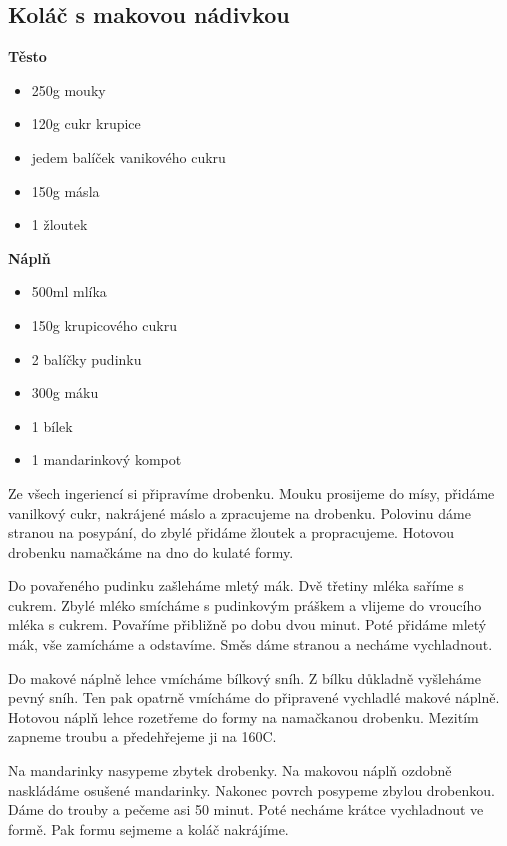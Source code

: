 \documentclass[10pt,a4paper]{article}
\newenvironment{myitemize}
{ \begin{itemize}
    \setlength{\itemsep}{0pt}
    \setlength{\parskip}{0pt}
    \setlength{\parsep}{0pt}     }
{ \end{itemize}                  }
\begin{document}
\subsection{Koláč s makovou nádivkou} 
\begin{minipage}[t]{0,5\textwidth}
\textbf{Těsto}
\begin{myitemize} 
\item 250g mouky
\item 120g cukr krupice
\item jedem balíček vanikového cukru
\item 150g másla
\item 1 žloutek
\end{myitemize}

\textbf{Náplň}
\begin{myitemize} 
\item 500ml mlíka
\item 150g krupicového cukru
\item 2 balíčky pudinku
\item 300g máku
\item 1 bílek
\item 1 mandarinkový kompot
\end{myitemize}
\end{minipage}
\begin{minipage}[t]{0,5\textwidth}
Ze všech ingeriencí si připravíme drobenku. Mouku prosijeme do mísy, přidáme vanilkový cukr, nakrájené máslo a zpracujeme na drobenku. Polovinu dáme stranou na posypání, do zbylé přidáme žloutek a propracujeme. Hotovou drobenku namačkáme na dno do kulaté formy.

Do povařeného pudinku zašleháme mletý mák. Dvě třetiny mléka saříme s cukrem. Zbylé mléko smícháme s pudinkovým práškem a vlijeme do vroucího mléka s cukrem. Povaříme přibližně po dobu dvou minut. Poté přidáme mletý mák, vše zamícháme a odstavíme. Směs dáme stranou a necháme vychladnout.

Do makové náplně lehce vmícháme bílkový sníh. Z bílku důkladně vyšleháme pevný sníh. Ten pak opatrně vmícháme do připravené vychladlé makové náplně. Hotovou náplň lehce rozetřeme do formy na namačkanou drobenku. Mezitím zapneme troubu a předehřejeme ji na 160\degree C.

Na mandarinky nasypeme zbytek drobenky. Na makovou náplň ozdobně naskládáme osušené mandarinky. Nakonec povrch posypeme zbylou drobenkou. Dáme do trouby a pečeme asi 50 minut. Poté necháme krátce vychladnout ve formě. Pak formu sejmeme a koláč nakrájíme.
\end{minipage}
\pagebreak
\end{document}
